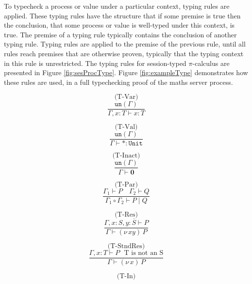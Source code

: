 \documentclass{l4proj}
\begin{document}
\quad To typecheck a process or value under a particular context, typing rules are applied. These typing rules have the structure that if some premise is true then the conclusion, that some process or value is well-typed under this context, is true. The premise of a typing rule typically contains the conclusion of another typing rule. Typing rules are applied to the premise of the previous rule, until all rules reach premises that are otherwise proven, typically that the typing context in this rule is unrestricted. The typing rules for session-typed $\pi$-calculus are presented in Figure \ref{fig:sesProcType}. Figure \ref{fig:exampleType} demonstrates how these rules are used, in a full typechecking proof of the maths server process.

\begin{figure}[H]
\begin{subfigure}{0.24\textwidth}
\[\text{(T-Var)}\]
\[\frac{\texttt{un}(\Gamma)}{\Gamma, x:T \vdash x:T}\]
\vspace{\fill}
\end{subfigure}
\begin{subfigure}{0.24\textwidth}
\[\text{(T-Val)}\]
\[\frac{\texttt{un}(\Gamma)}{\Gamma \vdash \texttt{*} : \texttt{Unit}}\]
\vspace{\fill}
\end{subfigure}
\begin{subfigure}{0.24\textwidth}
\[\text{(T-Inact)}\]
\[\frac{\texttt{un}(\Gamma)}{\Gamma \vdash \textbf{0}}\]
\vspace{\fill}
\end{subfigure}
\begin{subfigure}{0.24\textwidth}
\[\text{(T-Par)}\]
\[\frac{\Gamma_{1} \vdash P \quad \Gamma_{2} \vdash Q}{\Gamma_{1} \circ \Gamma_{2} \vdash P \mid Q}\]
\vspace{\fill}
\end{subfigure}
\begin{subfigure}{0.48\textwidth}
\[\text{(T-Res)}\]
\[\frac{\Gamma, x:S, y:\overline{S} \vdash P}{\Gamma \vdash (\nu\,xy)\,P}\]
\vspace{\fill}
\end{subfigure}
\begin{subfigure}{0.48\textwidth}
\[\text{(T-StndRes)}\] 
\[\frac{\Gamma, x:T \vdash P \:\:\: \text{T is not an S}}{\Gamma \vdash (\nu\,x)\,P}\]
\vspace{\fill}
\end{subfigure}
\begin{subfigure}{0.48\textwidth}
\[\text{(T-In)}\]

\end{subfigure}
\end{figure}
\end{document}
